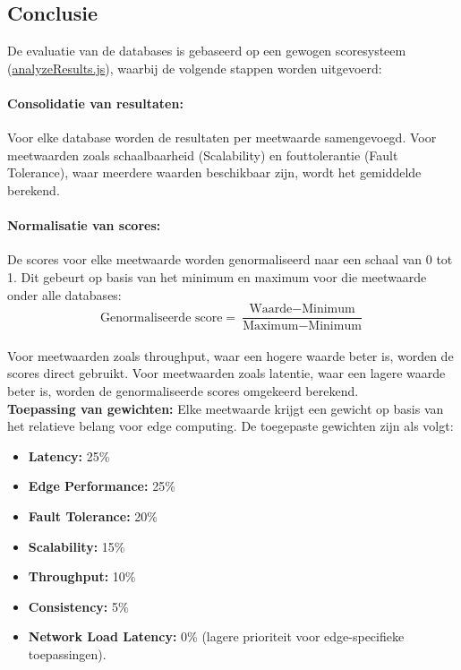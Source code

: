 \subsection{Conclusie}
De evaluatie van de databases is gebaseerd op een gewogen scoresysteem (\href{https://github.com/WoutVC/bachelorproef2024/blob/main/proof_of_concept/analyzeResults.js}{analyzeResults.js}), waarbij de volgende stappen worden uitgevoerd:

\paragraph{Consolidatie van resultaten:} 
Voor elke database worden de resultaten per meetwaarde samengevoegd. Voor meetwaarden zoals schaalbaarheid (Scalability) en fouttolerantie (Fault Tolerance), waar meerdere waarden beschikbaar zijn, wordt het gemiddelde berekend.

\paragraph{Normalisatie van scores:} 
De scores voor elke meetwaarde worden genormaliseerd naar een schaal van 0 tot 1. Dit gebeurt op basis van het minimum en maximum voor die meetwaarde onder alle databases:
\[
\text{Genormaliseerde score} = \frac{\text{Waarde} - \text{Minimum}}{\text{Maximum} - \text{Minimum}}
\]\\
Voor meetwaarden zoals throughput, waar een hogere waarde beter is, worden de scores direct gebruikt.
Voor meetwaarden zoals latentie, waar een lagere waarde beter is, worden de genormaliseerde scores omgekeerd berekend.\\

\textbf{Toepassing van gewichten:} Elke meetwaarde krijgt een gewicht op basis van het relatieve belang voor edge computing. De toegepaste gewichten zijn als volgt:
\begin{itemize}
	\item \textbf{Latency:} 25\%
	\item \textbf{Edge Performance:} 25\%
	\item \textbf{Fault Tolerance:} 20\%
	\item \textbf{Scalability:} 15\%
	\item \textbf{Throughput:} 10\%
	\item \textbf{Consistency:} 5\%
	\item \textbf{Network Load Latency:} 0\% (lagere prioriteit voor edge-specifieke toepassingen).
\end{itemize}


